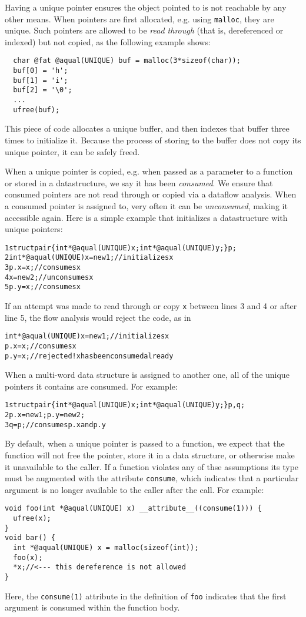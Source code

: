 Having a unique pointer ensures the object pointed to is not reachable by
any other means.  When pointers are first allocated, e.g. using
\texttt{malloc}, they are unique.  Such pointers are allowed to be
\emph{read through} (that is, dereferenced or indexed) but not copied, as
the following example shows:
\begin{verbatim}
  char @fat @aqual(UNIQUE) buf = malloc(3*sizeof(char));
  buf[0] = 'h';
  buf[1] = 'i';
  buf[2] = '\0';
  ...
  ufree(buf);
\end{verbatim}
This piece of code allocates a unique buffer, and then indexes that buffer
three times to initialize it.  Because the process of storing to the
buffer does not copy its unique pointer, it can be safely freed.

When a unique pointer is copied, e.g. when passed as a parameter to a
function or stored in a datastructure, we say it has been \emph{consumed}.
We ensure that consumed pointers are not read through or copied via a
dataflow analysis.  When a consumed pointer is assigned to, very often it
can be \emph{unconsumed}, making it accessible again.  Here is a simple
example that initializes a datastructure with unique pointers:
\begin{alltt}
{\small 1}  struct pair \{ int *@aqual(UNIQUE) x; int *@aqual(UNIQUE) y; \} p;
{\small 2}  int *@aqual(UNIQUE) x = new 1;  // initializes x
{\small 3}  p.x = x;            // consumes x
{\small 4}  x = new 2;          // unconsumes x
{\small 5}  p.y = x;            // consumes x
\end{alltt}
If an attempt was made to read through or copy \texttt{x} between lines 3
and 4 or after line 5, the flow analysis would reject the code, as in
\begin{alltt}
  int *@aqual(UNIQUE) x = new 1;  // initializes x
  p.x = x;            // consumes x
  p.y = x;            // rejected! x has been consumed already
\end{alltt}
When a multi-word data structure is assigned to another one, all of the
unique pointers it contains are consumed.  For example:
\begin{alltt}
{\small 1}  struct pair \{ int *@aqual(UNIQUE) x; int *@aqual(UNIQUE) y; \} p, q;
{\small 2}  p.x = new 1; p.y = new 2;
{\small 3}  q = p;              // consumes p.x and p.y
\end{alltt}

By default, when a unique pointer is passed to a function, we expect
that the function will not free the pointer, store it in a data
structure, or otherwise make it unavailable to the caller.  If a
function violates any of thse assumptions its type must be augmented
with the attribute \texttt{consume}, which indicates that a particular
argument is no longer available to the caller after the call.  For
example:
\begin{verbatim}
void foo(int *@aqual(UNIQUE) x) __attribute__((consume(1))) {
  ufree(x);
}
void bar() {
  int *@aqual(UNIQUE) x = malloc(sizeof(int));
  foo(x);
  *x;//<--- this dereference is not allowed
}
\end{verbatim}
Here, the \texttt{consume(1)} attribute in the definition of
\texttt{foo} indicates that the first argument is consumed within the
function body.  


